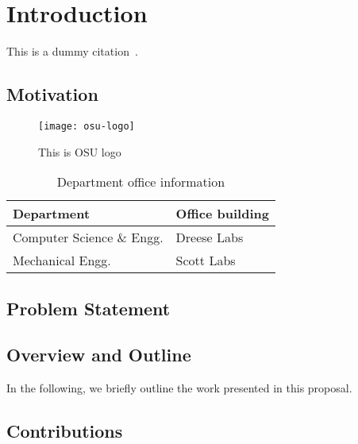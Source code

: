 
\chapter{Introduction}
\label{chap:introduction}

\lipsum

This is a dummy citation~\cite{dummy}.

\section{Motivation}
\label{sec:intro:motivation}
\begin{figure}[h]
  \centering
  \texttt{[image: osu-logo]}
  \caption{This is OSU logo}
  \label{fig:osulogo}
\end{figure}

\begin{table}[h]
  \begin{tabular}{|l|l|}
  \hline
  Department & Office building \\\hline\hline
  Computer Science \& Engg. & Dreese Labs \\\hline
  Mechanical Engg. & Scott Labs \\\hline
  \end{tabular}
  \caption{Department office information}
  \label{tab:dept}
\end{table}

\section{Problem Statement}
\label{sec:intro:problem}

\section{Overview and Outline}
\label{sec:intro:overview}

In the following, we briefly outline the work presented in this proposal.


\section{Contributions}
\label{sec:intro:contributions}
